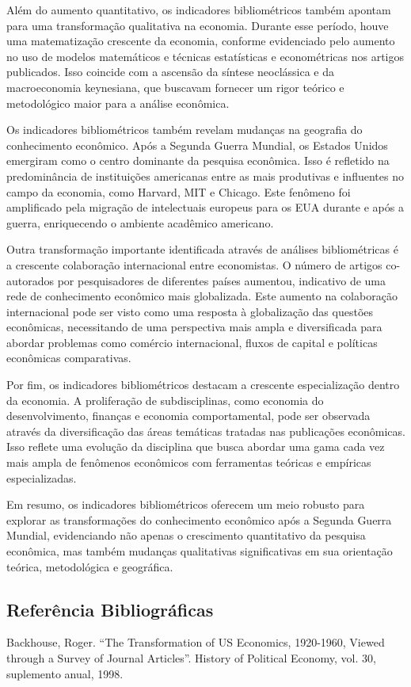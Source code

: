 \documentclass[a4paper,12pt]{article}[abntex2]
\begin{document}
Além do aumento quantitativo, os indicadores bibliométricos também apontam para uma transformação qualitativa na economia. Durante esse período, houve uma matematização crescente da economia, conforme evidenciado pelo aumento no uso de modelos matemáticos e técnicas estatísticas e econométricas nos artigos publicados. Isso coincide com a ascensão da síntese neoclássica e da macroeconomia keynesiana, que buscavam fornecer um rigor teórico e metodológico maior para a análise econômica.

Os indicadores bibliométricos também revelam mudanças na geografia do conhecimento econômico. Após a Segunda Guerra Mundial, os Estados Unidos emergiram como o centro dominante da pesquisa econômica. Isso é refletido na predominância de instituições americanas entre as mais produtivas e influentes no campo da economia, como Harvard, MIT e Chicago. Este fenômeno foi amplificado pela migração de intelectuais europeus para os EUA durante e após a guerra, enriquecendo o ambiente acadêmico americano.

Outra transformação importante identificada através de análises bibliométricas é a crescente colaboração internacional entre economistas. O número de artigos co-autorados por pesquisadores de diferentes países aumentou, indicativo de uma rede de conhecimento econômico mais globalizada. Este aumento na colaboração internacional pode ser visto como uma resposta à globalização das questões econômicas, necessitando de uma perspectiva mais ampla e diversificada para abordar problemas como comércio internacional, fluxos de capital e políticas econômicas comparativas.

Por fim, os indicadores bibliométricos destacam a crescente especialização dentro da economia. A proliferação de subdisciplinas, como economia do desenvolvimento, finanças e economia comportamental, pode ser observada através da diversificação das áreas temáticas tratadas nas publicações econômicas. Isso reflete uma evolução da disciplina que busca abordar uma gama cada vez mais ampla de fenômenos econômicos com ferramentas teóricas e empíricas especializadas.

Em resumo, os indicadores bibliométricos oferecem um meio robusto para explorar as transformações do conhecimento econômico após a Segunda Guerra Mundial, evidenciando não apenas o crescimento quantitativo da pesquisa econômica, mas também mudanças qualitativas significativas em sua orientação teórica, metodológica e geográfica.

\subsection{\textbf{Referência Bibliográficas}}
Backhouse, Roger. “The Transformation of US Economics, 1920-1960, Viewed through a
Survey of Journal Articles”. History of Political Economy, vol. 30, suplemento anual, 1998.
\end{document}
